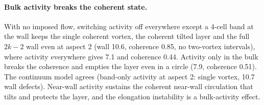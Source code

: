 \documentclass[aps,prl,onecolumn,superscriptaddress,amsmath,amssymb,nofootinbib]{revtex4-2}
\begin{document}
\paragraph{Bulk activity breaks the coherent state.} With no imposed flow, switching activity off everywhere except a 4-cell band at the wall keeps the single coherent vortex, the
coherent tilted layer and the full $2k-2$ wall even at aspect 2 (wall 10.6, coherence 0.85, no two-vortex intervals), where activity everywhere gives 7.1 and coherence 0.44. Activity
only in the bulk breaks the coherence and empties the layer even in a circle (7.9, coherence 0.51). The continuum model agrees (band-only activity at aspect 2: single vortex, 10.7 wall
defects). Near-wall activity sustains the coherent near-wall circulation that tilts and protects the layer, and the elongation instability is a bulk-activity effect.
\end{document}
